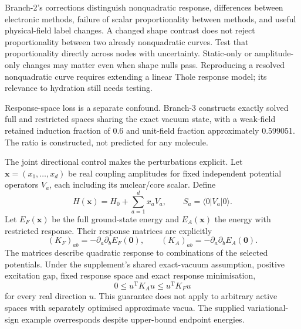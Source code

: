 \documentclass{article}
\begin{document}
Branch-2's corrections distinguish nonquadratic response, differences between electronic methods, failure of scalar proportionality between methods, and useful physical-field label changes. A changed shape contrast does not reject proportionality between two already nonquadratic curves. Test that proportionality directly across nodes with uncertainty. Static-only or amplitude-only changes may matter even when shape nulls pass. Reproducing a resolved nonquadratic curve requires extending a linear Thole response model; its relevance to hydration still needs testing.

Response-space loss is a separate confound. Branch-3 constructs exactly solved full and restricted spaces sharing the exact vacuum state, with a weak-field retained induction fraction of 0.6 and unit-field fraction approximately 0.599051. The ratio is constructed, not predicted for any molecule.

The joint directional control makes the perturbations explicit. Let $\mathbf{x}=(x_1,\ldots,x_d)$ be real coupling amplitudes for fixed independent potential operators $V_a$, each including its nuclear/core scalar. Define
\begin{equation*}
H(\mathbf{x})=H_0+\sum_{a=1}^d x_aV_a,\qquad S_a=\langle0|V_a|0\rangle.
\end{equation*}
Let $E_F(\mathbf{x})$ be the full ground-state energy and $E_A(\mathbf{x})$ the energy with restricted response. Their response matrices are explicitly
\begin{equation*}
(K_F)_{ab}=-\partial_a\partial_bE_F(\mathbf{0}),\qquad
(K_A)_{ab}=-\partial_a\partial_bE_A(\mathbf{0}).
\end{equation*}
The matrices describe quadratic response to combinations of the selected potentials. Under the supplement's shared exact-vacuum assumption, positive excitation gap, fixed response space and exact response minimisation,
\begin{equation*}
0\leq u^{\mathrm T}K_Au\leq u^{\mathrm T}K_Fu
\end{equation*}
for every real direction $u$. This guarantee does not apply to arbitrary active spaces with separately optimised approximate vacua. The supplied variational-sign example overresponds despite upper-bound endpoint energies.
\end{document}
